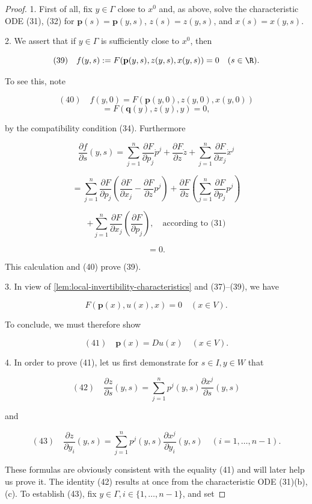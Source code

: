 \begin{proof}
1. First of all, fix $y \in \Gamma$ close to $x^0$ and, as above, solve the characteristic ODE (31), (32) for $\textbf{p}(s) = \textbf{p}(y, s)$, $z(s) = z(y, s)$, and $x(s) = x(y, s)$.

2. We assert that if $y \in \Gamma$ is sufficiently close to $x^0$, then

$$(39) \quad f(y, s) := F(\textbf{p}(y, s), z(y, s), x(y, s)) = 0 \quad (s \in \R).$$

To see this, note

$$(40) \quad f(y, 0) = F(\mathbf{p}(y, 0), z(y, 0), x(y, 0))$$
$$= F(\mathbf{q}(y), z(y), y) = 0,$$

by the compatibility condition (34). Furthermore

$$\frac{\partial f}{\partial s}(y, s) = \sum_{j=1}^{n} \frac{\partial F}{\partial p_j} \dot{p}^j + \frac{\partial F}{\partial z} \dot{z} + \sum_{j=1}^{n} \frac{\partial F}{\partial x_j} \dot{x}^j$$

$$= \sum_{j=1}^{n} \frac{\partial F}{\partial p_j} \left( \frac{\partial F}{\partial x_j} - \frac{\partial F}{\partial z} p^j \right) + \frac{\partial F}{\partial z} \left( \sum_{j=1}^{n} \frac{\partial F}{\partial p_j} p^j \right)$$

$$+ \sum_{j=1}^{n} \frac{\partial F}{\partial x_j} \left( \frac{\partial F}{\partial p_j} \right), \quad \text{according to (31)}$$

$$= 0.$$

This calculation and (40) prove (39).

3. In view of \cref{lem:local-invertibility-characteristics} and (37)--(39), we have

$$F(\mathbf{p}(x), u(x), x) = 0 \quad (x \in V).$$

To conclude, we must therefore show

$$(41) \quad \mathbf{p}(x) = Du(x) \quad (x \in V).$$

4. In order to prove (41), let us first demonstrate for $s \in I, y \in W$ that

$$(42) \quad \frac{\partial z}{\partial s}(y, s) = \sum_{j=1}^{n} p^j(y, s) \frac{\partial x^j}{\partial s}(y, s)$$

and

$$(43) \quad \frac{\partial z}{\partial y_i}(y, s) = \sum_{j=1}^{n} p^j(y, s) \frac{\partial x^j}{\partial y_i}(y, s) \quad (i = 1, \ldots, n-1).$$

These formulas are obviously consistent with the equality (41) and will later help us prove it. The identity (42) results at once from the characteristic ODE (31)(b),(c). To establish (43), fix $y \in \Gamma, i \in \{1, \ldots, n-1\}$, and set


\end{proof}
